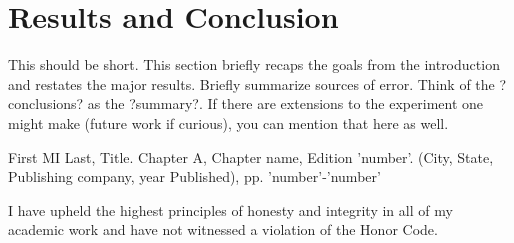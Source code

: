 \documentclass[11PT, a4paper]{article}
\begin{document}
\section{Results and Conclusion}
This should be short. This section briefly recaps the goals from the introduction and restates the
major results. Briefly summarize sources of error. Think of the ?conclusions? as the
?summary?. If there are extensions to the experiment one might make (future work if curious),
you can mention that here as well.

\newpage


\begin{thebibliography}{10} %




First MI Last, Title. Chapter A, Chapter name, Edition 'number'. (City, State, Publishing company, year Published), pp. 'number'-'number'



\end{thebibliography}

\vfill
I have upheld the highest principles of honesty and integrity in all of my academic work and have not witnessed a violation of the Honor Code.

\end{document}
